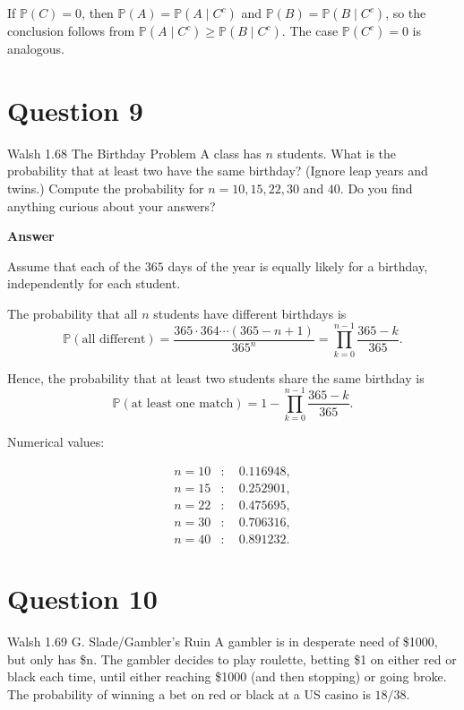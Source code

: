 \documentclass[letterpaper]{article}
\begin{document}
			If $\mathbb{P}(C)=0$, then $\mathbb{P}(A)=\mathbb{P}(A\mid C^c)$ and
			$\mathbb{P}(B)=\mathbb{P}(B\mid C^c)$, so the conclusion follows from
			$\mathbb{P}(A\mid C^c)\ge \mathbb{P}(B\mid C^c)$. The case $\mathbb{P}(C^c)=0$
			is analogous.
		
		
		\clearpage
		
		\section{Question 9}
		
		{\color{deepred} Walsh 1.68 The Birthday Problem} A class has $n$ students. What is the probability that at least two have the same birthday? (Ignore leap years and twins.) Compute the probability for $n = 10, 15, 22, 30$ and $40$. Do you find anything curious about your answers?
		
		\textbf{Answer}
		
		Assume that each of the $365$ days of the year is equally likely for a birthday,
		independently for each student.
		
		The probability that all $n$ students have different birthdays is
		\[
		\mathbb{P}(\text{all different})
		=
		\frac{365 \cdot 364 \cdots (365-n+1)}{365^n}
		=
		\prod_{k=0}^{n-1} \frac{365-k}{365}.
		\]
		
		Hence, the probability that at least two students share the same birthday is
		\[
		\mathbb{P}(\text{at least one match})
		=
		1 - \prod_{k=0}^{n-1} \frac{365-k}{365}.
		\]
		
		\medskip
		
		Numerical values:
		
		\[
		\begin{aligned}
			n=10 &: \quad 0.116948, \\
			n=15 &: \quad 0.252901, \\
			n=22 &: \quad 0.475695, \\
			n=30 &: \quad 0.706316, \\
			n=40 &: \quad 0.891232.
		\end{aligned}
		\]
		
		\medskip
		
		\clearpage
		
		\section{Question 10}
		
		
		{\color{deepred} Walsh 1.69 G. Slade/Gambler's Ruin} A gambler is in desperate need of \$1000, but only has \$n. The gambler decides to play roulette, betting \$1 on either red or black each time, until either reaching \$1000 (and then stopping) or going broke. The probability of winning a bet on red or black at a US casino is $18/38$.
	
\end{document}
